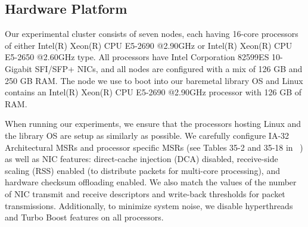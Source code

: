 

\subsection{Hardware Platform}
\label{sec:exp_setup}
Our experimental cluster consists of seven nodes,
each having 16-core processors of either 
Intel(R) Xeon(R) CPU E5-2690 @2.90GHz
or Intel(R) Xeon(R) CPU E5-2650 @2.60GHz type.
All processors have Intel Corporation 82599ES 10-Gigabit SFI/SFP+ NICs,
and all nodes are configured with a mix of 126 GB and 250 GB RAM.
The node we use to boot into our baremetal library OS and Linux
contains an Intel(R) Xeon(R) CPU E5-2690 @2.90GHz processor
with 126 GB of RAM.

When running our experiments,
we ensure that the processors hosting Linux and the library OS
are setup as similarly as possible.
We carefully configure IA-32 Architectural MSRs and processor specific MSRs
(see Tables 35-2 and 35-18 in ~\cite{intel_msr})
as well as NIC features:
direct-cache injection (DCA) disabled,
receive-side scaling (RSS) enabled
(to distribute packets for multi-core processing),
and hardware checksum offloading enabled.
We also match the values of
the number of NIC transmit and receive descriptors
and write-back thresholds for packet transmissions.
Additionally, to minimize system noise,
we disable hyperthreads and Turbo Boost features on all processors.


